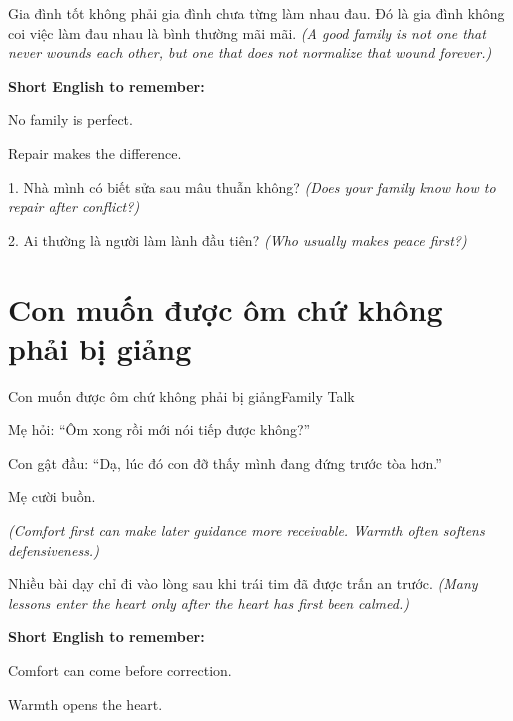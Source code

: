 \begin{baihoc}
Gia đình tốt không phải gia đình chưa từng làm nhau đau. Đó là gia đình không coi việc làm đau nhau là bình thường mãi mãi.
\textit{(A good family is not one that never wounds each other, but one that does not normalize that wound forever.)}
\end{baihoc}

\begin{ghinhoanh}
\textbf{Short English to remember:}

No family is perfect.

Repair makes the difference.
\end{ghinhoanh}

\begin{tuhocnhanh}
1. Nhà mình có biết sửa sau mâu thuẫn không? \textit{(Does your family know how to repair after conflict?)}

2. Ai thường là người làm lành đầu tiên? \textit{(Who usually makes peace first?)}
\end{tuhocnhanh}
\ngancach

\section{Con muốn được ôm chứ không phải bị giảng}
\begin{truyen}{Con muốn được ôm chứ không phải bị giảng}{Family Talk}

Mẹ hỏi: ``Ôm xong rồi mới nói tiếp được không?''

Con gật đầu: ``Dạ, lúc đó con đỡ thấy mình đang đứng trước tòa hơn.''

Mẹ cười buồn.

\textit{(Comfort first can make later guidance more receivable. Warmth often softens defensiveness.)}
\end{truyen}

\begin{baihoc}
Nhiều bài dạy chỉ đi vào lòng sau khi trái tim đã được trấn an trước.
\textit{(Many lessons enter the heart only after the heart has first been calmed.)}
\end{baihoc}

\begin{ghinhoanh}
\textbf{Short English to remember:}

Comfort can come before correction.

Warmth opens the heart.
\end{ghinhoanh}

